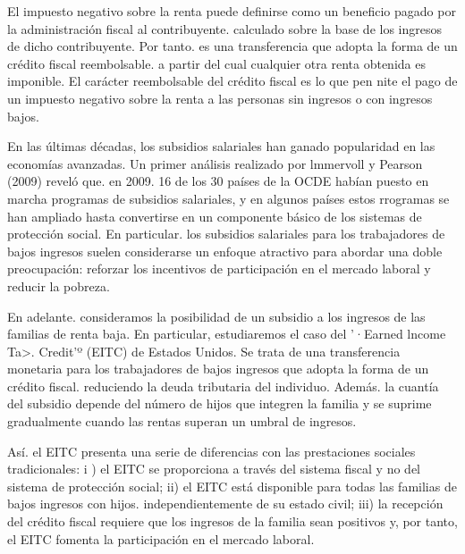 \documentclass[10pt,a4paper]{article}
\begin{document}
El impuesto negativo sobre la renta puede definirse como un beneficio pagado por la administración fiscal al contribuyente. calculado sobre la base de los ingresos de dicho contribuyente. Por tanto. es una transferencia que adopta la forma de un crédito fiscal reembolsable. a partir del cual cualquier otra renta obtenida es imponible. El carácter reembolsable del crédito fiscal es lo que pen nite el pago de un impuesto negativo sobre la renta a las personas sin ingresos o con ingresos bajos.

En las últimas décadas, los subsidios salariales han ganado popularidad en las economías avanzadas. Un primer análisis realizado por lmmervoll y Pearson (2009) reveló que. en 2009. 16 de los 30 países de la OCDE habían puesto en marcha programas de subsidios salariales, y en algunos países estos rrogramas se han ampliado hasta convertirse en un componente básico de los sistemas de protección social. En particular. los subsidios salariales para los trabajadores de bajos ingresos suelen considerarse un enfoque atractivo para abordar una doble preocupación: reforzar los incentivos de participación en el mercado laboral y reducir la pobreza. 

En adelante. consideramos la posibilidad de un subsidio a los ingresos de las familias de renta baja. En particular, estudiaremos el caso del '·Earned lncome Ta>. Credit'º (EITC) de Estados Unidos. Se trata de una transferencia monetaria para los trabajadores de bajos ingresos que adopta la forma de un crédito fiscal. reduciendo la deuda tributaria del individuo. Además. la cuantía del subsidio depende del número de hijos que integren la familia y se suprime gradualmente cuando las rentas superan un umbral de ingresos.

Así. el EITC presenta una serie de diferencias con las prestaciones sociales tradicionales: i ) el EITC se proporciona a través del sistema fiscal y no del sistema de protección social; ii) el EITC está disponible para todas las familias de bajos ingresos con hijos. independientemente de su estado civil; iii) la recepción del crédito fiscal requiere que los ingresos de la familia sean positivos y, por tanto, el EITC fomenta la participación en el mercado laboral.
\end{document}
